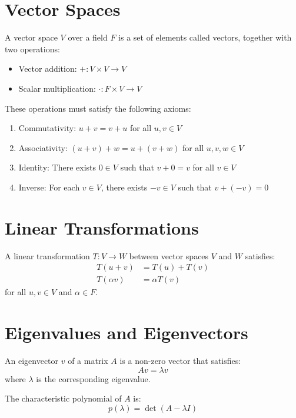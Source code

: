 
\section{Vector Spaces}

A vector space $V$ over a field $F$ is a set of elements called vectors, together with two operations:
\begin{itemize}
    \item Vector addition: $+ : V \times V \to V$
    \item Scalar multiplication: $\cdot : F \times V \to V$
\end{itemize}

These operations must satisfy the following axioms:
\begin{enumerate}
    \item Commutativity: $u + v = v + u$ for all $u,v \in V$
    \item Associativity: $(u + v) + w = u + (v + w)$ for all $u,v,w \in V$
    \item Identity: There exists $0 \in V$ such that $v + 0 = v$ for all $v \in V$
    \item Inverse: For each $v \in V$, there exists $-v \in V$ such that $v + (-v) = 0$
\end{enumerate}

\section{Linear Transformations}

A linear transformation $T: V \to W$ between vector spaces $V$ and $W$ satisfies:
\begin{align}
    T(u + v) &= T(u) + T(v) \\
    T(\alpha v) &= \alpha T(v)
\end{align}
for all $u,v \in V$ and $\alpha \in F$.

\section{Eigenvalues and Eigenvectors}

An eigenvector $v$ of a matrix $A$ is a non-zero vector that satisfies:
\begin{equation}
    Av = \lambda v
\end{equation}
where $\lambda$ is the corresponding eigenvalue.

The characteristic polynomial of $A$ is:
\begin{equation}
    p(\lambda) = \det(A - \lambda I)
\end{equation} 